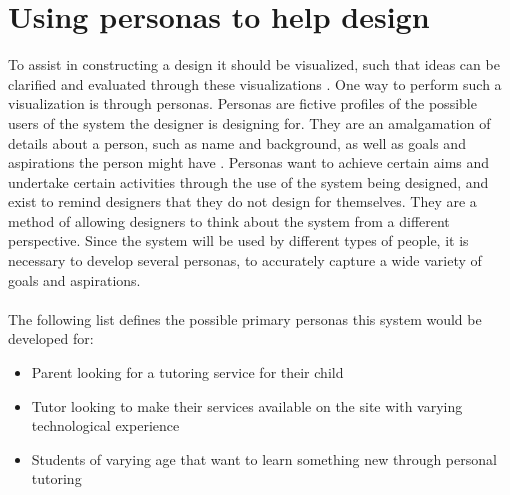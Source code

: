 \section{Using personas to help design}
To assist in constructing a design it should be visualized, such that ideas can be clarified and evaluated through these visualizations \cite{DEB}.
One way to perform such a visualization is through personas.
Personas are fictive profiles of the possible users of the system the designer is designing for.
They are an amalgamation of details about a person, such as name and background, as well as goals and aspirations the person might have \cite{DEB}.
Personas want to achieve certain aims and undertake certain activities through the use of the system being designed, and exist to remind designers that they do not design for themselves.
They are a method of allowing designers to think about the system from a different perspective.
Since the system will be used by different types of people, it is necessary to develop several personas, to accurately capture a wide variety of goals and aspirations.
\\\\
The following list defines the possible primary personas this system would be developed for:
\begin{itemize}
    \item Parent looking for a tutoring service for their child
    \item Tutor looking to make their services available on the site with varying technological experience
    \item Students of varying age that want to learn something new through personal tutoring
\end{itemize}

